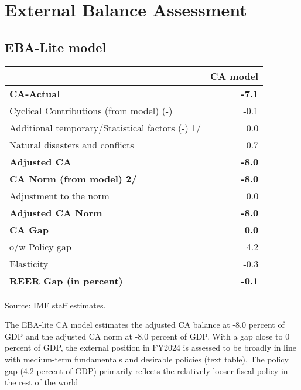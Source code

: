 \documentclass[12pt]{article}
\begin{document}





\section{External Balance Assessment}
\subsection{EBA-Lite model}


\begin{table}[h!]
\centering
\renewcommand{\arraystretch}{1.3} %

\begin{tabular}{@{}l r@{}} %
\hline
 & \textbf{CA model} \\
\hline
\textbf{CA-Actual} & \textbf{-7.1} \\
\quad Cyclical Contributions (from model) (-) & -0.1 \\
\quad Additional temporary/Statistical factors (-) 1/ & 0.0 \\
\quad Natural disasters and conflicts & 0.7 \\
\textbf{Adjusted CA} & \textbf{-8.0} \\[6pt]

\textbf{CA Norm (from model) 2/} & \textbf{-8.0} \\
\quad Adjustment to the norm & 0.0 \\
\textbf{Adjusted CA Norm} & \textbf{-8.0} \\[6pt]

\textbf{CA Gap} & \textbf{0.0} \\
\quad o/w Policy gap & 4.2 \\[6pt]

Elasticity & -0.3 \\
\textbf{REER Gap (in percent)} & \textbf{-0.1} \\
\hline
\end{tabular}

\vspace{2pt}

\centering
\quad \quad \parbox{\linewidth}{\hspace{0pt}\footnotesize Source: IMF staff estimates.}

\end{table}
The EBA-lite CA model estimates the adjusted CA balance at -8.0 percent of GDP and the 
adjusted CA norm at -8.0 percent of GDP. With a gap close to 0 percent of GDP, the external position in 
FY2024 is assessed to be broadly in line with medium-term fundamentals and desirable policies (text table). 
The policy gap (4.2 percent of GDP) primarily reflects the relatively looser fiscal policy in the rest of the 
world
\end{document}
